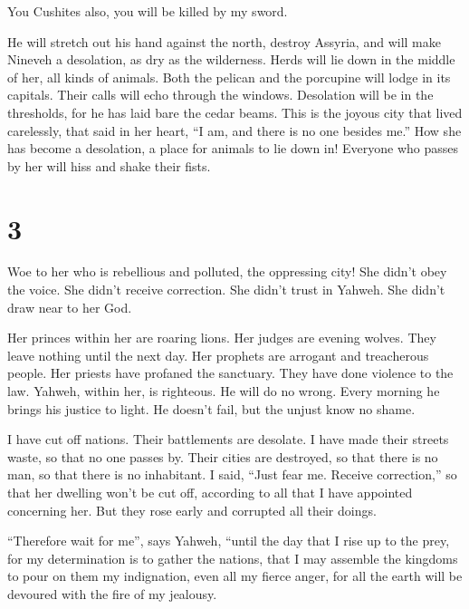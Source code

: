  You Cushites also, you will be killed by my sword.

 He will stretch out his hand against the north, destroy
Assyria, and will make Nineveh a desolation, as dry as the wilderness.
 Herds will lie down in the middle of her, all kinds of
animals. Both the pelican and the porcupine will lodge in its capitals.
Their calls will echo through the windows. Desolation will be in the
thresholds, for he has laid bare the cedar beams.  This is
the joyous city that lived carelessly, that said in her heart, ``I am,
and there is no one besides me.'' How she has become a desolation, a
place for animals to lie down in! Everyone who passes by her will hiss
and shake their fists.

\hypertarget{section-2}{%
\section{3}\label{section-2}}

 Woe to her who is rebellious and polluted, the oppressing
city!  She didn't obey the voice. She didn't receive
correction. She didn't trust in Yahweh. She didn't draw near to her God.

 Her princes within her are roaring lions. Her judges are
evening wolves. They leave nothing until the next day.  Her
prophets are arrogant and treacherous people. Her priests have profaned
the sanctuary. They have done violence to the law.  Yahweh,
within her, is righteous. He will do no wrong. Every morning he brings
his justice to light. He doesn't fail, but the unjust know no shame.

 I have cut off nations. Their battlements are desolate. I
have made their streets waste, so that no one passes by. Their cities
are destroyed, so that there is no man, so that there is no inhabitant.
 I said, ``Just fear me. Receive correction,'' so that her
dwelling won't be cut off, according to all that I have appointed
concerning her. But they rose early and corrupted all their doings.

 ``Therefore wait for me'', says Yahweh, ``until the day
that I rise up to the prey, for my determination is to gather the
nations, that I may assemble the kingdoms to pour on them my
indignation, even all my fierce anger, for all the earth will be
devoured with the fire of my jealousy.

